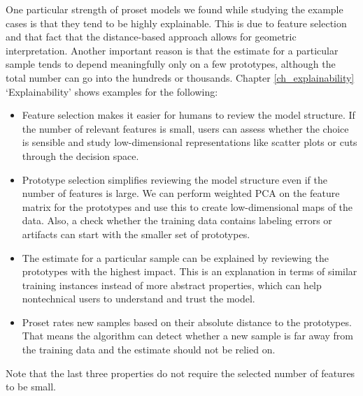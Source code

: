 %
One particular strength of proset models we found while studying the example cases is that they tend to be highly explainable.
This is due to feature selection and that fact that the distance-based approach allows for geometric interpretation.
Another important reason is that the estimate for a particular sample tends to depend meaningfully only on a few prototypes, although the total number can go into the hundreds or thousands.
Chapter \ref{ch_explainability} `Explainability' shows examples for the following:
%
\begin{itemize}
\item Feature selection makes it easier for humans to review the model structure.
If the number of relevant features is small, users can assess whether the choice is sensible and study low-dimensional representations like scatter plots or cuts through the decision space.
%
\item Prototype selection simplifies reviewing the model structure even if the number of features is large.
We can perform weighted PCA on the feature matrix for the prototypes and use this to create low-dimensional maps of the data.
Also, a check whether the training data contains labeling errors or artifacts can start with the smaller set of prototypes.
%
\item The estimate for a particular sample can be explained by reviewing the prototypes with the highest impact.
This is an explanation in terms of similar training instances instead of more abstract properties, which can help nontechnical users to understand and trust the model.
%
\item Proset rates new samples based on their absolute distance to the prototypes.
That means the algorithm can detect whether a new sample is far away from the training data and the estimate should not be relied on.
\end{itemize}
%
Note that the last three properties do not require the selected number of features to be small.
%
